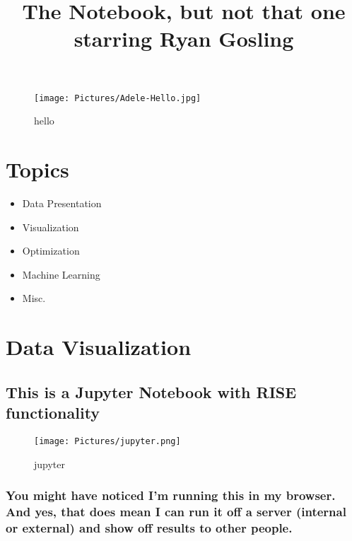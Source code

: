 \documentclass[11pt]{article}
\title{The Notebook, but not that one starring Ryan Gosling }
\makeatletter
\def\maxwidth{\ifdim\Gin@nat@width>\linewidth\linewidth
    \else\Gin@nat@width\fi}
\let\Oldincludegraphics\includegraphics
\renewcommand{\includegraphics}[1]{\Oldincludegraphics[width=.8\maxwidth]{#1}}
\providecommand{\tightlist}{%
      \setlength{\itemsep}{0pt}\setlength{\parskip}{0pt}}
\makeatother
\begin{document}
    
    
    \maketitle
    
    

    
    \begin{figure}
\centering
\texttt{[image: Pictures/Adele-Hello.jpg]}
\caption{hello}
\end{figure}

    \section{Topics}\label{topics}

\begin{itemize}
\tightlist
\item
  Data Presentation
\item
  Visualization
\item
  Optimization
\item
  Machine Learning
\item
  Misc.
\end{itemize}

    \section{Data Visualization}\label{data-visualization}

\subsection{This is a Jupyter Notebook with RISE
functionality}\label{this-is-a-jupyter-notebook-with-rise-functionality}

\begin{figure}
\centering
\texttt{[image: Pictures/jupyter.png]}
\caption{jupyter}
\end{figure}

    \subsubsection{You might have noticed I'm running this in my browser.
And yes, that does mean I can run it off a server (internal or external)
and show off results to other
people.}\label{you-might-have-noticed-im-running-this-in-my-browser.-and-yes-that-does-mean-i-can-run-it-off-a-server-internal-or-external-and-show-off-results-to-other-people.}
\end{document}
